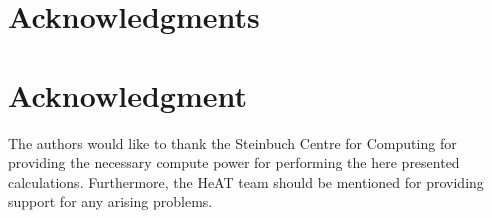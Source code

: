 
\ifCLASSOPTIONcompsoc
  \section*{Acknowledgments}
\else
  \section*{Acknowledgment}
\fi
The authors would like to thank the Steinbuch Centre for Computing for providing the necessary compute power for
performing the here presented calculations.
Furthermore, the HeAT team should be mentioned for providing support for any arising problems.
